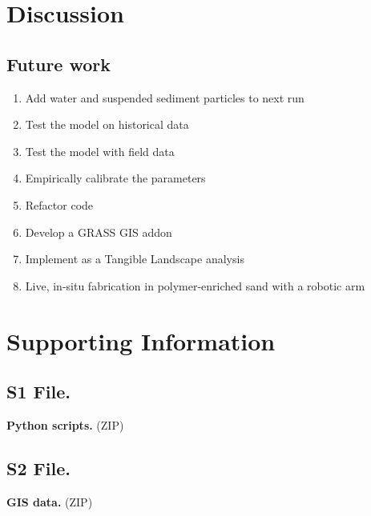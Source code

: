 \documentclass[10pt,letterpaper]{article}
\begin{document}
\section*{Discussion}

\subsection*{Future work}
\begin{enumerate}
\item Add water and suspended sediment particles to next run
\item Test the model on historical data
\item Test the model with field data
\item Empirically calibrate the parameters
\item Refactor code
\item Develop a GRASS GIS addon
\item Implement as a Tangible Landscape analysis
\item Live, in-situ fabrication in polymer-enriched sand with a robotic arm
\end{enumerate}


\section*{Supporting Information}

\subsection*{S1 File.}
\label{S1_File}
{\bf Python scripts.}
(ZIP)

\subsection*{S2 File.}
\label{S2_File}
{\bf GIS data.}
(ZIP)


\end{document}
